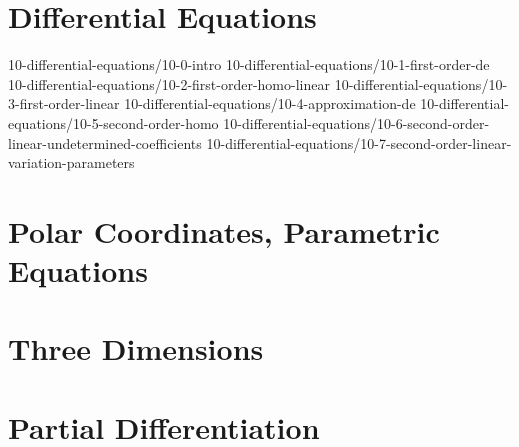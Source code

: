 \chapter{Differential Equations}\label{chap:DifferentialEquations}
	{10-differential-equations/10-0-intro}
	{10-differential-equations/10-1-first-order-de}
	{10-differential-equations/10-2-first-order-homo-linear}
	{10-differential-equations/10-3-first-order-linear}
	{10-differential-equations/10-4-approximation-de}
	{10-differential-equations/10-5-second-order-homo}
	{10-differential-equations/10-6-second-order-linear-undetermined-coefficients}
	{10-differential-equations/10-7-second-order-linear-variation-parameters}
%
\chapter{Polar Coordinates, Parametric Equations}\label{chap:PolarParametricEquations}
	
	
	
	
		
	
	
\chapter{Three Dimensions}\label{chap:ThreeDimensions}
	
	
	
	
	
	


\chapter{Partial Differentiation}\label{chap:PartialDifferentiation}
	
	
	
	
	
	
	
	
	
